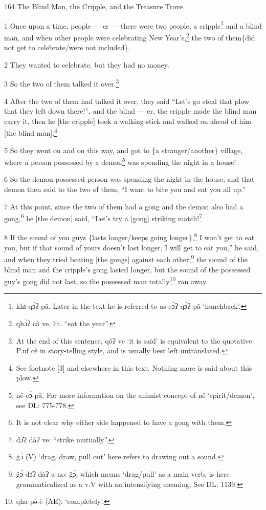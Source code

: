 
164 The Blind Man, the Cripple, and the Treasure Trove

1 Once upon a time, people --- er --- there were two people, a cripple\footnote{khɨ-qɔ̀ʔ-pā. Later in the text he is referred to as cɔ̀ʔ-qɔ̀ʔ-pā `hunchback'.} and a
blind man, and when other people were celebrating New Year's,\footnote{qhɔ̀ʔ câ ve, lit. ``eat the year''.} the two of them\{did
not get to celebrate/were not included\}.

2 They wanted to celebrate, but they had no money.

3 So the two of them talked it over.\footnote{At the end of this sentence, qôʔ ve `it is said' is equivalent to the quotative P.uf cê in story-telling style, and is usually best left untranslated.}

4 After the two of them had talked it over, they said ``Let's go steal that plow
that they left down there!'', and the blind --- er, the cripple made the blind
man carry it, then he [the cripple] took a walking-stick and walked on ahead of
him [the blind man].\footnote{See footnote [3] and elsewhere in this text. Nothing more is said about this plow.}

5 So they went on and on this way, and got to \{a stranger/another\} village, where
a person possessed by a demon\footnote{nê-cɔ̀-pā. For more information on the animist concept of nê `spirit/demon', see DL: 775-778.} was spending the night in a house!

6 So the demon-possessed person was spending the night in the house, and that demon
then said to the two of them, ``I want to bite you and eat you all up.''

7 At this point, since the two of them had a gong and the demon also had a gong,\footnote{It is not clear why either side happened to have a gong with them.}
he [the demon] said, ``Let's try a [gong] striking match!\footnote{dɔ̂ʔ dàʔ ve: ``strike mutually''.}

8 If the sound of you guys \{lasts longer/keeps going longer\},\footnote{g̈ɔ̀ (V) `drag, draw, pull out' here refers to drawing out a sound.} I won't get
to eat you, but if that sound of yours doesn't last longer, I will get to eat you,''
he said, and when they tried beating [the gongs] against each other,\footnote{g̈ɔ̀ dɔ̂ʔ dàʔ a-no: g̈ɔ̀, which means `drag/pull' as a main verb, is here grammaticalized as a v.V with an intensifying meaning. See DL: 1139.} the sound
of the blind man and the cripple's gong lasted longer, but the sound of the possessed
guy's gong did not last, so the possessed man totally\footnote{qha-pə̀-è (AE): `completely'.} ran away.

